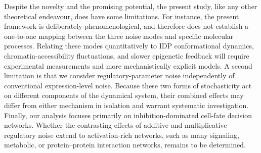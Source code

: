\documentclass[11pt]{article}
\begin{document}
Despite the novelty and the promising potential, the present study, like any other theoretical endeavour, does have some limitations. For instance, the present framework is deliberately phenomenological, and therefore does not establish a one-to-one mapping between the three noise modes and specific molecular processes. Relating these modes quantitatively to IDP conformational dynamics, chromatin-accessibility fluctuations, and slower epigenetic feedback will require experimental measurements and more mechanistically explicit models. A second limitation is that we consider regulatory-parameter noise independently of conventional expression-level noise. Because these two forms of stochasticity act on different components of the dynamical system, their combined effects may differ from either mechanism in isolation and warrant systematic investigation. Finally, our analysis focuses primarily on inhibition-dominated cell-fate decision networks. Whether the contrasting effects of additive and multiplicative regulatory noise extend to activation-rich networks, such as many signaling, metabolic, or protein--protein interaction networks, remains to be determined.

\end{document}
